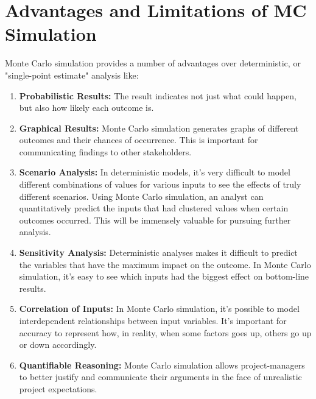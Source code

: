 \section{Advantages and Limitations of MC Simulation}
Monte Carlo simulation provides a number of advantages \cite{MCSimulation} over deterministic, or "single-point estimate" analysis like:
\begin{enumerate}
	\item \textbf{Probabilistic Results:} The result indicates not just what could happen, but also how likely each outcome is.
	 \item \textbf{Graphical Results:} Monte Carlo simulation generates graphs of different outcomes and their chances of occurrence. This is important for communicating findings to other stakeholders.
	 \item \textbf{Scenario Analysis:} In deterministic models, it's very difficult to model different combinations of values for various inputs to see the effects of truly different scenarios. Using Monte Carlo simulation, an analyst can quantitatively predict the inputs that had clustered values when certain outcomes occurred. This will be immensely valuable for pursuing further analysis.
     \item \textbf{Sensitivity Analysis:} Deterministic analyses makes it difficult to predict the variables that have the maximum impact on the outcome. In Monte Carlo simulation, it’s easy to see which inputs had the biggest effect on bottom-line results.
	 \item \textbf{Correlation of Inputs:} In Monte Carlo simulation, it's possible to model interdependent relationships between input variables. It's important for accuracy to represent how, in reality, when some factors goes up, others go up or down accordingly.
	 \item \textbf{Quantifiable Reasoning:} Monte Carlo simulation allows project-managers to better justify and communicate their arguments in the face of unrealistic project expectations.
\end{enumerate}

 

